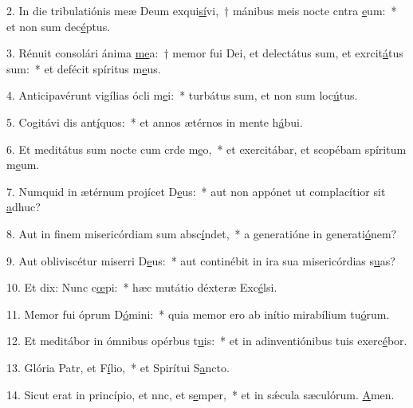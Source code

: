 2. In die tribulatiónis meæ Deum exqui\uline{sí}vi,~† mánibus meis nocte cntra \uline{e}um:~* et non sum dec\uline{é}ptus.\par 
3. Rénuit consolári ánima \uline{me}a:~† memor fui Dei, et delectátus sum, et exrcit\uline{á}tus sum:~* et defécit spíritus m\uline{e}us.\par 
4. Anticipavérunt vigílias ócli m\uline{e}i:~* turbátus sum, et non sum loc\uline{ú}tus.\par 
5. Cogitávi dis ant\uline{í}quos:~* et annos ætérnos in mente h\uline{á}bui.\par 
6. Et meditátus sum nocte cum crde m\uline{e}o,~* et exercitábar, et scopébam spíritum m\uline{e}um.\par 
7. Numquid in ætérnum projícet D\uline{e}us:~* aut non appónet ut complacítior sit \uline{a}dhuc?\par 
8. Aut in finem misericórdiam sum absc\uline{í}ndet,~* a generatióne in generati\uline{ó}nem?\par 
9. Aut obliviscétur miserri D\uline{e}us:~* aut continébit in ira sua misericórdias s\uline{u}as?\par 
10. Et dix: Nunc c\uline{œ}pi:~* hæc mutátio déxteræ Exc\uline{é}lsi.\par 
11. Memor fui óprum D\uline{ó}mini:~* quia memor ero ab inítio mirabílium tu\uline{ó}rum.\par 
12. Et meditábor in ómnibus opérbus t\uline{u}is:~* et in adinventiónibus tuis exerc\uline{é}bor.\par 
13. Glória Patr, et F\uline{í}lio,~* et Spirítui S\uline{a}ncto.\par 
14. Sicut erat in princípio, et nnc, et s\uline{e}mper,~* et in sǽcula sæculórum. \uline{A}men.\par 
